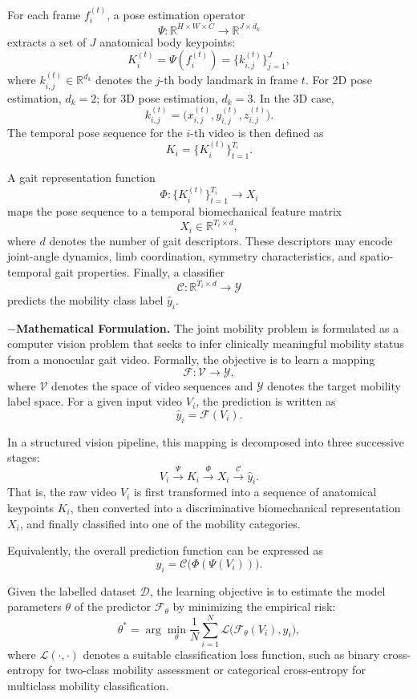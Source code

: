 \documentclass[12pt,nopreprintline]{elsarticle}
\begin{document}
For each frame \(f_i^{(t)}\), a pose estimation operator
\[
\Psi: \mathbb{R}^{H \times W \times C} \rightarrow \mathbb{R}^{J \times d_k}
\]
extracts a set of \(J\) anatomical body keypoints:
\[
K_i^{(t)}=\Psi(f_i^{(t)})=\{k_{i,j}^{(t)}\}_{j=1}^{J},
\]
where \(k_{i,j}^{(t)} \in \mathbb{R}^{d_k}\) denotes the \(j\)-th body landmark in frame \(t\). For 2D pose estimation, \(d_k=2\); for 3D pose estimation, \(d_k=3\). In the 3D case,
\[
k_{i,j}^{(t)}=\bigl(x_{i,j}^{(t)},y_{i,j}^{(t)},z_{i,j}^{(t)}\bigr).
\]
The temporal pose sequence for the \(i\)-th video is then defined as
\[
K_i=\{K_i^{(t)}\}_{t=1}^{T_i}.
\]

A gait representation function
\[
\Phi: \{K_i^{(t)}\}_{t=1}^{T_i} \rightarrow X_i
\]
maps the pose sequence to a temporal biomechanical feature matrix
\[
X_i \in \mathbb{R}^{T_i \times d},
\]
where \(d\) denotes the number of gait descriptors. These descriptors may encode joint-angle dynamics, limb coordination, symmetry characteristics, and spatio-temporal gait properties. Finally, a classifier
\[
\mathcal{C}: \mathbb{R}^{T_i \times d} \rightarrow \mathcal{Y}
\]
predicts the mobility class label \(\hat{y}_i\).

$-$\noindent\textbf{Mathematical Formulation.}
The joint mobility problem is formulated as a computer vision problem that seeks to infer clinically meaningful mobility status from a monocular gait video. Formally, the objective is to learn a mapping
\[
\mathcal{F}: \mathcal{V} \rightarrow \mathcal{Y},
\]
where \(\mathcal{V}\) denotes the space of video sequences and \(\mathcal{Y}\) denotes the target mobility label space. For a given input video \(V_i\), the prediction is written as
\[
\hat{y}_i=\mathcal{F}(V_i).
\]

In a structured vision pipeline, this mapping is decomposed into three successive stages:
\[
V_i \xrightarrow{\Psi} K_i \xrightarrow{\Phi} X_i \xrightarrow{\mathcal{C}} \hat{y}_i.
\]
That is, the raw video \(V_i\) is first transformed into a sequence of anatomical keypoints \(K_i\), then converted into a discriminative biomechanical representation \(X_i\), and finally classified into one of the mobility categories.

Equivalently, the overall prediction function can be expressed as
\[
\hat{y}_i=\mathcal{C}\bigl(\Phi(\Psi(V_i))\bigr).
\]

Given the labelled dataset \(\mathcal{D}\), the learning objective is to estimate the model parameters \(\theta\) of the predictor \(\mathcal{F}_\theta\) by minimizing the empirical risk:
\[
\theta^\ast=\arg\min_{\theta}\frac{1}{N}\sum_{i=1}^{N}\mathcal{L}\bigl(\mathcal{F}_\theta(V_i),y_i\bigr),
\]
where \(\mathcal{L}(\cdot,\cdot)\) denotes a suitable classification loss function, such as binary cross-entropy for two-class mobility assessment or categorical cross-entropy for multiclass mobility classification.
\end{document}
